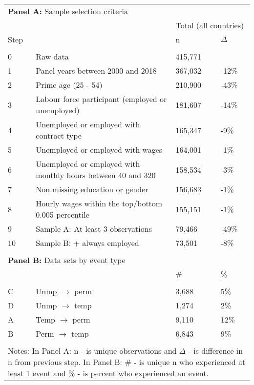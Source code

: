 \begin{tabular}{l>{\raggedright\arraybackslash}p{4in}ll}
   \toprule 
 
\multicolumn{4}{l}{{\bf Panel A:} Sample selection criteria} \\ 

&  & 
\multicolumn{2}{l}{Total (all countries)}
\\  
 
 
\multicolumn{1}{l}{Step} & 
\multicolumn{1}{l}{Description} 
& n & $\Delta$
\\ 
\cmidrule(lr){1-2}
\cmidrule(lr){3-4}
\\[-1.8ex]  
 
0 & Raw data & 415,771 &  \\ 
  1 & Panel years between 2000 and 2018 & 367,032 & -12\% \\ 
  2 & Prime age (25 - 54) & 210,900 & -43\% \\ 
  3 & Labour force participant (employed or unemployed) & 181,607 & -14\% \\ 
  4 & Unemployed or employed with contract type & 165,347 & -9\% \\ 
  5 & Unemployed or employed with wages & 164,001 & -1\% \\ 
  6 & Unemployed or employed with monthly hours between 40 and 320 & 158,534 & -3\% \\ 
  7 & Non missing education or gender & 156,683 & -1\% \\ 
  8 & Hourly wages within the top/bottom 0.005 percentile & 155,151 & -1\% \\ 
  9 & Sample A: At least 3 observations & 79,466 & -49\% \\ 
  10 & Sample B: + always employed & 73,501 & -8\% \\ 
   
\hline \\[-1.8ex]  
 
\multicolumn{4}{l}{{\bf Panel B:} Data sets by event type} \\ 

& & 
\# & \%
\\ 
\cmidrule(lr){1-2}
\cmidrule(lr){3-4}
\\[-1.8ex]  
 
C & Unmp $\rightarrow$ perm & 3,688 & 5\% \\ 
  D & Unmp $\rightarrow$ temp & 1,274 & 2\% \\ 
  A & Temp $\rightarrow$ perm & 9,110 & 12\% \\ 
  B & Perm $\rightarrow$ temp & 6,843 & 9\% \\ 
   \bottomrule \\[-1.8ex] \multicolumn{4}{p{6in}}{Notes: In Panel A: n - is unique observations and $\Delta$ - is difference in n from previous step.  In Panel B: \# - is unique n who experienced at least 1 event and \% - is percent who experienced an event.} 
\end{tabular}
